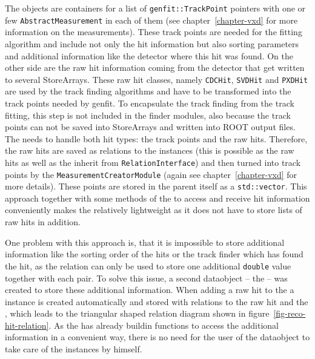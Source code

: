 The \Track objects are containers for a list of \texttt{genfit::TrackPoint} pointers with one or few \texttt{AbstractMeasurement} in each of them (see chapter~\ref{chapter-vxd} for more information on the measurements). These track points are needed for the fitting algorithm and include not only the hit information but also sorting parameters and additional information like the detector where this hit was found. On the other side are the raw hit information coming from the detector that get written to several StoreArrays. These raw hit classes, namely \texttt{CDCHit}, \texttt{SVDHit} and \texttt{PXDHit} are used by the track finding algorithms and have to be transformed into the track points needed by genfit. To encapsulate the track finding from the track fitting, this step is not included in the finder modules, also because the track points can not be saved into StoreArrays and written into ROOT output files. The \RecoTrack needs to handle both hit types: the track points and the raw hits. Therefore, the raw hits are saved as relations to the \RecoTrack instances (this is possible as the raw hits as well as the \RecoTrack inherit from \texttt{RelationInterface}) and then turned into track points by the \texttt{MeasurementCreatorModule} (again see chapter~\ref{chapter-vxd} for more details). These points are stored in the parent \Track itself as a \texttt{std::vector}. This approach together with some methods of the \RecoTrack to access and receive hit information conveniently makes the \RecoTrack relatively lightweight as it does not have to store lists of raw hits in addition.

One problem with this approach is, that it is impossible to store additional information like the sorting order of the hits or the track finder which has found the hit, as the relation can only be used to store one additional \texttt{double} value together with each pair. To solve this issue, a second dataobject -- the \Hit -- was created to store these additional information. When adding a raw hit to the \RecoTrack a \Hit instance is created automatically and stored with relations to the raw hit and the \RecoTrack, which leads to the triangular shaped relation diagram shown in figure~\ref{fig-reco-hit-relation}. As the \RecoTrack has already buildin functions to access the additional information in a convenient way, there is no need for the user of the dataobject to take care of the \Hit instances by himself. 

